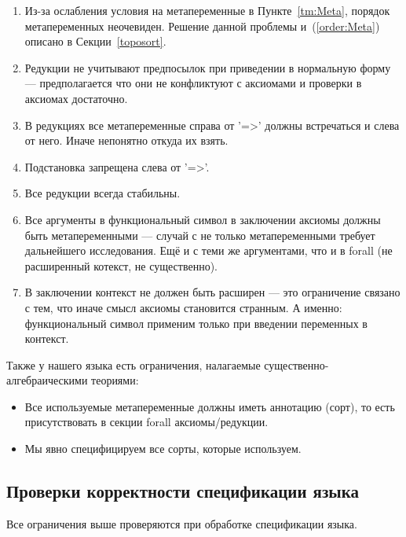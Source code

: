 \begin{enumerate}
\item Из-за ослабления условия на метапеременные в Пункте~\ref{tm:Meta}, порядок метапеременных неочевиден. Решение данной проблемы и~(\ref{order:Meta}) описано в Секции~\ref{toposort}.

\item Редукции не учитывают предпосылок при приведении в нормальную форму --- предполагается что они не конфликтуют с аксиомами и проверки в аксиомах достаточно.

\item В редукциях все метапеременные справа от '=>' должны встречаться и слева от него. Иначе непонятно откуда их взять.

\item Подстановка запрещена слева от '=>'.

\item Все редукции всегда стабильны.

\item Все аргументы в функциональный символ в заключении аксиомы должны быть метапеременными --- случай с не только метапеременными требует дальнейшего исследования. Ещё и с теми же аргументами, что и в forall (не расширенный котекст, не существенно).

\item В заключении контекст не должен быть расширен --- это ограничение связано с тем, что иначе смысл аксиомы становится странным. А именно: функциональный символ применим только при введении переменных в контекст.

\end{enumerate}

Также у нашего языка есть ограничения, налагаемые существенно-алгебраическими теориями:
\begin{itemize}
\item Все используемые метапеременные должны иметь аннотацию (сорт), то есть присутствовать в секции forall аксиомы/редукции.
\item Мы явно специфицируем все сорты, которые используем.
\end{itemize}

\subsection{Проверки корректности спецификации языка}

Все ограничения выше проверяются при обработке спецификации языка.

